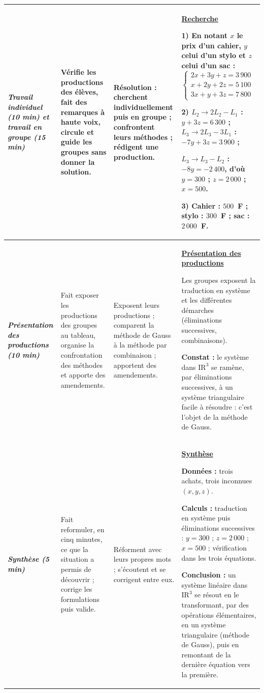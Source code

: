 \documentclass[10pt]{article}
\newcommand{\titreR}[1]{\underline{\textcolor{rougetitre}{\bfseries #1}}}
\newcommand{\moment}[1]{\textbf{\itshape #1}}
\newcommand{\mclef}[1]{\colorbox{jaunesurl}{#1}}
\newcommand{\Rd}[1]{\mathrm{IR}^{#1}}   %
\begin{document}
\begin{longtable}{|p{2.35cm}|p{5.35cm}|p{4.55cm}|p{13.85cm}|}
\moment{Travail individuel (10 min) et travail en groupe (15 min)} &
Vérifie les productions des élèves, fait des remarques à haute voix, circule et
guide les groupes sans donner la solution. &
\textbf{Résolution} : cherchent individuellement puis en groupe ; confrontent leurs
méthodes ; rédigent une production. &
\titreR{Recherche} \par
\textbf{1)} En notant $x$ le prix d'un cahier, $y$ celui d'un stylo et $z$ celui d'un sac : \;
$\left\{\begin{array}{l}2x+3y+z=3\,900 \\ x+2y+2z=5\,100 \\ 3x+y+3z=7\,800\end{array}\right.$ \par
\textbf{2)} $L_2 \to 2L_2-L_1$ : $y+3z=6\,300$ ; \; $L_3 \to 2L_3-3L_1$ : $-7y+3z=3\,900$ ; \par
$L_3 \to L_3-L_2$ : $-8y=-2\,400$, d'où $y=300$ ; $z=2\,000$ ; $x=500$. \par
\textbf{3)} Cahier : $500$~F ; stylo : $300$~F ; sac : $2\,000$~F. \\ \hline

\moment{Présentation des productions (10 min)} &
Fait exposer les productions des groupes au tableau, organise la confrontation des
méthodes et apporte des amendements. &
Exposent leurs productions ; comparent la méthode de Gauss à la méthode par
combinaison ; apportent des amendements. &
\titreR{Présentation des productions} \par
Les groupes exposent la traduction en système et les différentes démarches
(éliminations successives, combinaisons). \par
\textbf{Constat :} le système dans $\Rd{3}$ se ramène, par éliminations successives,
à un système triangulaire facile à résoudre : c'est l'objet de la \mclef{méthode de Gauss}. \\ \hline

\moment{Synthèse (5 min)} &
Fait reformuler, en cinq minutes, ce que la situation a permis de découvrir ;
corrige les formulations puis valide. &
Réforment avec leurs propres mots ; s'écoutent et se corrigent entre eux. &
\titreR{Synthèse} \par
\textbf{Données :} trois achats, trois inconnues $(x, y, z)$. \par
\textbf{Calculs :} traduction en système puis éliminations successives : $y = 300$ ;
$z = 2\,000$ ; $x = 500$ ; vérification dans les trois équations. \par
\textbf{Conclusion :} un système linéaire dans $\Rd{3}$ se résout en le transformant,
par des opérations élémentaires, en un \mclef{système triangulaire} (méthode de Gauss),
puis en remontant de la dernière équation vers la première. \\ \hline


\end{longtable}
\end{document}
